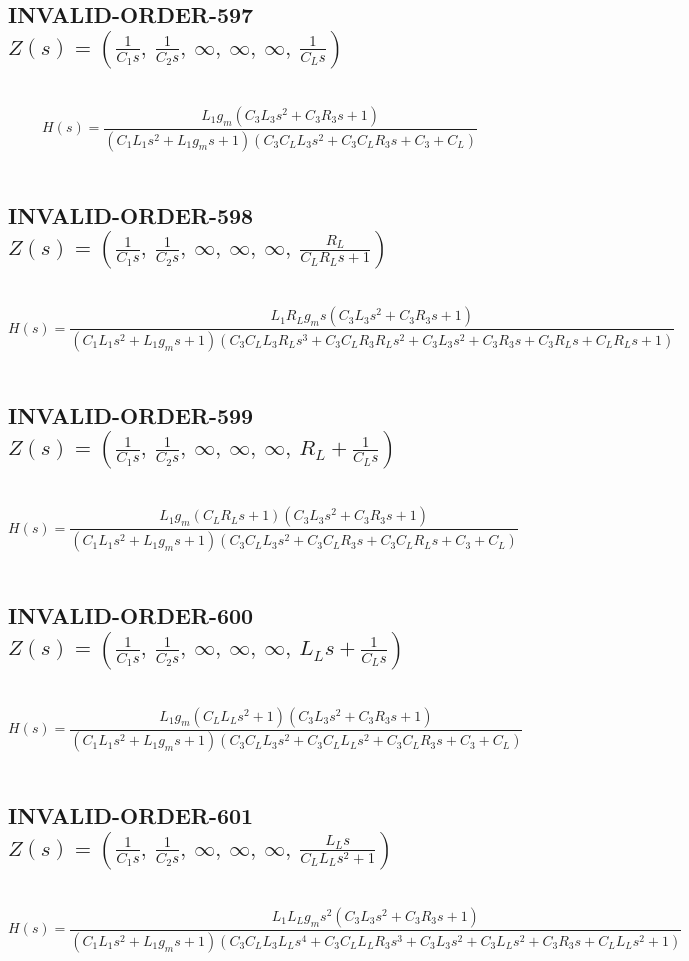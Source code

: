 \documentclass{article}
\begin{document}
\subsection{INVALID-ORDER-597 $Z(s) = \left( \frac{1}{C_{1} s}, \  \frac{1}{C_{2} s}, \  \infty, \  \infty, \  \infty, \  \frac{1}{C_{L} s}\right)$ } \ 
\textbf{\[H(s) = \frac{L_{1} g_{m} \left(C_{3} L_{3} s^{2} + C_{3} R_{3} s + 1\right)}{\left(C_{1} L_{1} s^{2} + L_{1} g_{m} s + 1\right) \left(C_{3} C_{L} L_{3} s^{2} + C_{3} C_{L} R_{3} s + C_{3} + C_{L}\right)}\] } \ 
\subsection{INVALID-ORDER-598 $Z(s) = \left( \frac{1}{C_{1} s}, \  \frac{1}{C_{2} s}, \  \infty, \  \infty, \  \infty, \  \frac{R_{L}}{C_{L} R_{L} s + 1}\right)$ } \ 
\textbf{\[H(s) = \frac{L_{1} R_{L} g_{m} s \left(C_{3} L_{3} s^{2} + C_{3} R_{3} s + 1\right)}{\left(C_{1} L_{1} s^{2} + L_{1} g_{m} s + 1\right) \left(C_{3} C_{L} L_{3} R_{L} s^{3} + C_{3} C_{L} R_{3} R_{L} s^{2} + C_{3} L_{3} s^{2} + C_{3} R_{3} s + C_{3} R_{L} s + C_{L} R_{L} s + 1\right)}\] } \ 
\subsection{INVALID-ORDER-599 $Z(s) = \left( \frac{1}{C_{1} s}, \  \frac{1}{C_{2} s}, \  \infty, \  \infty, \  \infty, \  R_{L} + \frac{1}{C_{L} s}\right)$ } \ 
\textbf{\[H(s) = \frac{L_{1} g_{m} \left(C_{L} R_{L} s + 1\right) \left(C_{3} L_{3} s^{2} + C_{3} R_{3} s + 1\right)}{\left(C_{1} L_{1} s^{2} + L_{1} g_{m} s + 1\right) \left(C_{3} C_{L} L_{3} s^{2} + C_{3} C_{L} R_{3} s + C_{3} C_{L} R_{L} s + C_{3} + C_{L}\right)}\] } \ 
\subsection{INVALID-ORDER-600 $Z(s) = \left( \frac{1}{C_{1} s}, \  \frac{1}{C_{2} s}, \  \infty, \  \infty, \  \infty, \  L_{L} s + \frac{1}{C_{L} s}\right)$ } \ 
\textbf{\[H(s) = \frac{L_{1} g_{m} \left(C_{L} L_{L} s^{2} + 1\right) \left(C_{3} L_{3} s^{2} + C_{3} R_{3} s + 1\right)}{\left(C_{1} L_{1} s^{2} + L_{1} g_{m} s + 1\right) \left(C_{3} C_{L} L_{3} s^{2} + C_{3} C_{L} L_{L} s^{2} + C_{3} C_{L} R_{3} s + C_{3} + C_{L}\right)}\] } \ 
\subsection{INVALID-ORDER-601 $Z(s) = \left( \frac{1}{C_{1} s}, \  \frac{1}{C_{2} s}, \  \infty, \  \infty, \  \infty, \  \frac{L_{L} s}{C_{L} L_{L} s^{2} + 1}\right)$ } \ 
\textbf{\[H(s) = \frac{L_{1} L_{L} g_{m} s^{2} \left(C_{3} L_{3} s^{2} + C_{3} R_{3} s + 1\right)}{\left(C_{1} L_{1} s^{2} + L_{1} g_{m} s + 1\right) \left(C_{3} C_{L} L_{3} L_{L} s^{4} + C_{3} C_{L} L_{L} R_{3} s^{3} + C_{3} L_{3} s^{2} + C_{3} L_{L} s^{2} + C_{3} R_{3} s + C_{L} L_{L} s^{2} + 1\right)}\] } \ 
\end{document}
